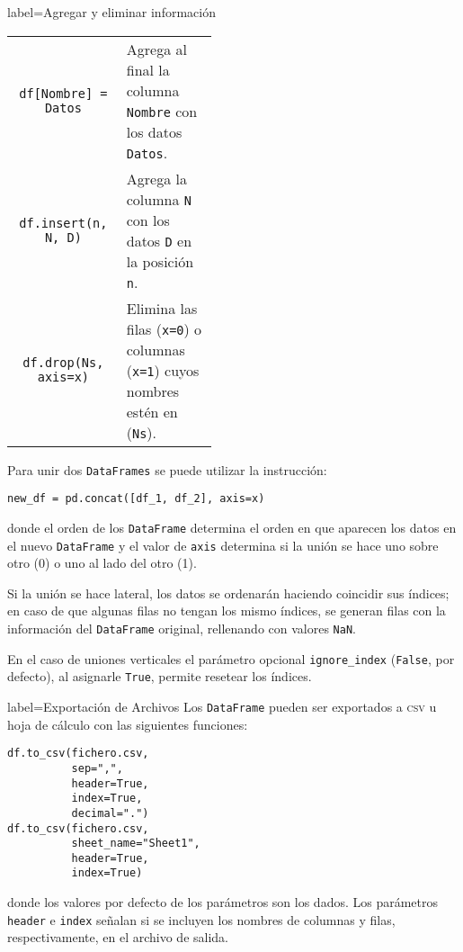 \begin{contentbox}{label=Agregar y eliminar información}
    \begin{tabular}{C|p{0.45\linewidth}}
        \lstinline!df[Nombre] = Datos! & Agrega al final la columna \lstinline!Nombre! con los datos \lstinline!Datos!. \\
        \lstinline!df.insert(n, N, D)! & Agrega la columna \lstinline!N! con los datos \lstinline!D! en la posición \lstinline!n!. \\
        \lstinline!df.drop(Ns, axis=x)! & Elimina las filas (\lstinline!x=0!) o columnas (\lstinline!x=1!) cuyos nombres estén en (\lstinline!Ns!). \\
    \end{tabular}
    
    \vspace{\baselineskip}
    Para unir dos \lstinline!DataFrames! se puede utilizar la instrucción:
    \begin{center}
        \lstinline!new_df = pd.concat([df_1, df_2], axis=x)!    
    \end{center}
    
    donde el orden de los \lstinline!DataFrame! determina el orden en que aparecen los datos en el nuevo \lstinline!DataFrame! y el valor de \lstinline!axis! determina si la unión se hace uno sobre otro (0) o uno al lado del otro (1).
    
    Si la unión se hace lateral, los datos se ordenarán haciendo coincidir sus índices; en caso de que algunas filas no tengan los mismo índices, se generan filas con la información del \lstinline!DataFrame! original, rellenando con valores \lstinline!NaN!.
    
    En el caso de uniones verticales el parámetro opcional \lstinline!ignore_index! (\lstinline!False!, por defecto), al asignarle \lstinline!True!, permite resetear los índices.
\end{contentbox}

\begin{contentbox}{label=Exportación de Archivos}
    Los \texttt{DataFrame} pueden ser exportados a \textsc{csv} u hoja de cálculo con las siguientes funciones:
    \begin{lstlisting}
df.to_csv(fichero.csv,
          sep=",",
          header=True,
          index=True,
          decimal=".")
df.to_csv(fichero.csv,
          sheet_name="Sheet1",
          header=True,
          index=True)
    \end{lstlisting}
    donde los valores por defecto de los parámetros son los dados. Los parámetros \texttt{header} e \texttt{index} señalan si se incluyen los nombres de columnas y filas, respectivamente, en el archivo de salida.
\end{contentbox}

